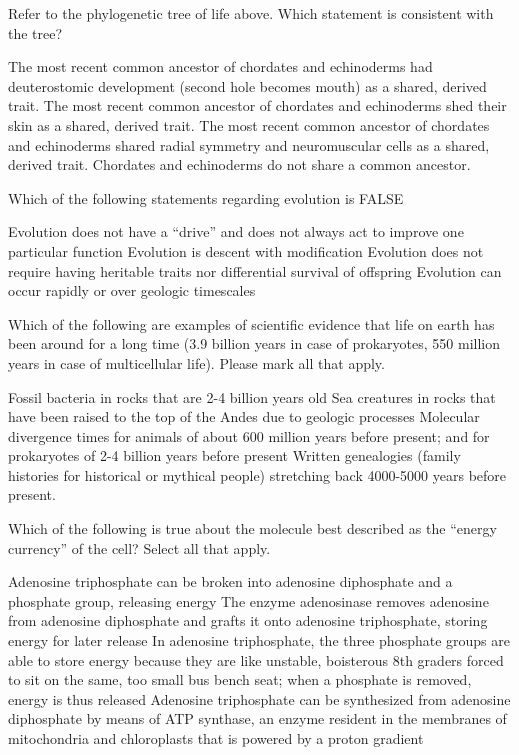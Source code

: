 \documentclass[exam,addpoints,noanswers]{exam}
\begin{document}
\begin{questions}
\question[1] Refer to the phylogenetic tree of life above. Which statement is consistent with the tree? 
\begin{choices}
\CorrectChoice The most recent common ancestor of chordates and echinoderms had deuterostomic development (second hole becomes mouth) as a shared, derived trait.
\choice The most recent common ancestor of chordates and echinoderms shed their skin as a shared, derived trait.
\choice The most recent common ancestor of chordates and echinoderms shared radial symmetry and neuromuscular cells as a shared, derived trait. 
\choice Chordates and echinoderms do not share a common ancestor. 
\end{choices}


\question[1] Which of the following statements regarding evolution is FALSE
\begin{choices}
\choice Evolution does not have a ``drive'' and does not always act to improve one particular function
\choice Evolution is descent with modification
\CorrectChoice Evolution does not require having heritable traits nor differential survival of offspring
\choice Evolution can occur rapidly or over geologic timescales
\end{choices}



\question[1] Which of the following are examples of scientific evidence that life on earth has been around for a long time (3.9 billion years in case of prokaryotes, 550 million years in case of multicellular life). Please mark all that apply.
\begin{choices} 
\CorrectChoice Fossil bacteria in rocks that are 2-4 billion years old
\CorrectChoice Sea creatures in rocks that have been raised to the top of the Andes due to geologic processes
\CorrectChoice Molecular divergence times for animals of about 600 million years before present; and for prokaryotes of 2-4 billion years before present
\choice Written genealogies (family histories for historical or mythical people) stretching back 4000-5000 years before present. 
\end{choices}




\question[1] Which of the following is true about the molecule best described as the ``energy currency'' of the cell? Select all that apply. 
\begin{choices}
\CorrectChoice Adenosine triphosphate can be broken into adenosine diphosphate and a phosphate group, releasing energy
\choice The enzyme adenosinase removes adenosine from adenosine diphosphate and grafts it onto adenosine triphosphate, storing energy for later release
\CorrectChoice In adenosine triphosphate, the three phosphate groups are able to store energy because they are like unstable, boisterous 8th graders forced to sit on the same, too small bus bench seat; when a phosphate is removed, energy is thus released
\CorrectChoice Adenosine triphosphate can be synthesized from adenosine diphosphate by means of ATP synthase, an enzyme resident in the membranes of mitochondria and chloroplasts that is powered by a proton gradient
\end{choices}




\end{questions}
\end{document}
